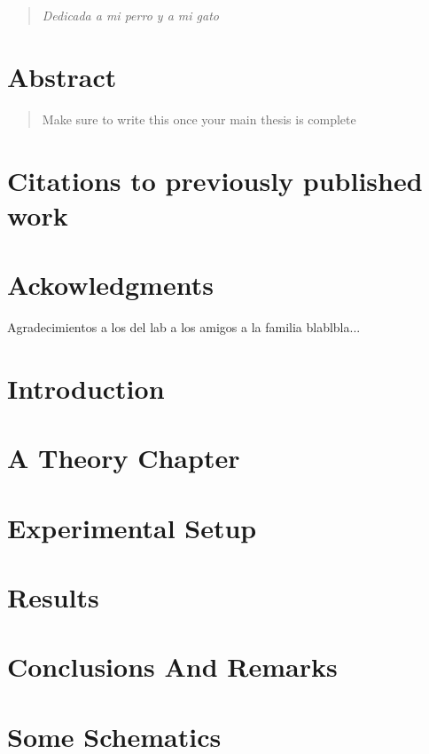 \documentclass[a4paper,11pt]{report} %
\begin{document}
\newpage
\thispagestyle{empty}
\mbox{}
\hfill\begin{minipage}{11cm}
\begin{quote}
\begin{flushright}
\textit{\hspace{0.5cm}
Dedicada a mi perro y a mi gato}
\end{flushright}
\end{quote}
\end{minipage}
\newpage
{}
\chapter*{Abstract}
\hfill\begin{minipage}{14.5cm}
\begin{quote}
\hspace{0.3cm} Make sure to write this once your main thesis is complete
\end{quote}
\end{minipage}
\chapter*{Citations to previously published work}
\chapter*{Ackowledgments}
Agradecimientos a los del lab a los amigos a la familia blablbla...
\tableofcontents
\chapter{Introduction}
\chapter{A Theory Chapter}
\chapter{Experimental Setup}
\chapter{Results}
\chapter{Conclusions And Remarks}
\appendix
\chapter{Some Schematics}\
\end{document}
